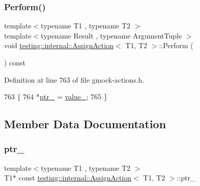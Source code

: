 \mbox{\label{classtesting_1_1internal_1_1AssignAction_a540912bec1f4de6fc4c7de26312e4586}} 
\subsubsection{\texorpdfstring{Perform()}{Perform()}}
{\footnotesize\ttfamily template$<$typename T1 , typename T2 $>$ \\
template$<$typename Result , typename Argument\+Tuple $>$ \\
void \hyperlink{classtesting_1_1internal_1_1AssignAction}{testing\+::internal\+::\+Assign\+Action}$<$ T1, T2 $>$\+::Perform (\begin{DoxyParamCaption}\item[{const Argument\+Tuple \&}]{ }\end{DoxyParamCaption}) const\hspace{0.3cm}{\ttfamily [inline]}}



Definition at line 763 of file gmock-\/actions.\+h.


\begin{DoxyCode}
763                                              \{
764     *\hyperlink{classtesting_1_1internal_1_1AssignAction_a49cdab549c200ecac64b348ba27b9d06}{ptr\_} = \hyperlink{classtesting_1_1internal_1_1AssignAction_a6b76b6b0b0483f2918dab3f2df960dce}{value\_};
765   \}
\end{DoxyCode}


\subsection{Member Data Documentation}
\mbox{\label{classtesting_1_1internal_1_1AssignAction_a49cdab549c200ecac64b348ba27b9d06}} 
\subsubsection{\texorpdfstring{ptr\+\_\+}{ptr\_}}
{\footnotesize\ttfamily template$<$typename T1 , typename T2 $>$ \\
T1$\ast$ const \hyperlink{classtesting_1_1internal_1_1AssignAction}{testing\+::internal\+::\+Assign\+Action}$<$ T1, T2 $>$\+::ptr\+\_\+\hspace{0.3cm}{\ttfamily [private]}}



